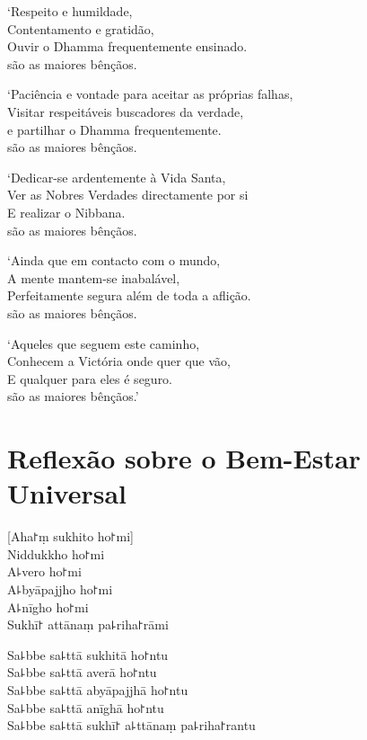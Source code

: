 `Respeito e humildade,\\
Contentamento e gratidão,\\
Ouvir o Dhamma frequentemente ensinado.\\
 são as maiores bênçãos.

`Paciência e vontade para aceitar as próprias falhas,\\
Visitar respeitáveis buscadores da verdade,\\
e partilhar o Dhamma frequentemente.\\
 são as maiores bênçãos.

\clearpage

`Dedicar-se ardentemente à Vida Santa,\\
Ver as Nobres Verdades directamente por si\\
E realizar o Nibbana.\\
 são as maiores bênçãos.

`Ainda que em contacto com o mundo,\\
A mente mantem-se inabalável,\\
Perfeitamente segura além de toda a aflição.\\
 são as maiores bênçãos.

`Aqueles que seguem este caminho,\\
Conhecem a Victória onde quer que vão,\\
E qualquer  para eles é seguro.\\
 são as maiores bênçãos.'

\chapter*[Bem-Estar Universal]{Reflexão sobre o Bem-Estar Universal}

\delegateSetUseNext


\begin{leader}
\end{leader}

[Aha꜓ṃ sukhito ho꜓mi]\\
Niddukkho ho꜓mi\\
A꜕vero ho꜓mi\\
A꜕byāpajjho ho꜓mi\\
A꜕nīgho ho꜓mi\\
Sukhī꜓ attānaṃ pa꜕riha꜓rāmi

Sa꜕bbe sa꜕ttā sukhitā ho꜓ntu\\
Sa꜕bbe sa꜕ttā averā ho꜓ntu\\
Sa꜕bbe sa꜕ttā abyāpajjhā ho꜓ntu\\
Sa꜕bbe sa꜕ttā anīghā ho꜓ntu\\
Sa꜕bbe sa꜕ttā sukhī꜓ a꜕ttānaṃ pa꜕riha꜓rantu

